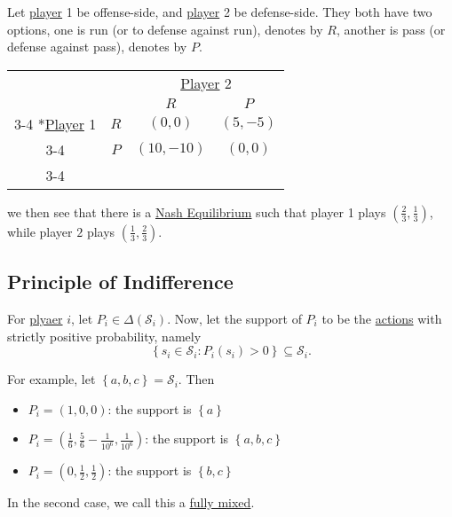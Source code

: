\begin{eg}[Football]\label{eg:football}
	Let \hyperref[def:player]{player} 1 be offense-side, and \hyperref[def:player]{player} 2 be defense-side. They both have two options, one is
	run (or to defense against run), denotes by \(R\), another is pass (or defense against pass), denotes by \(P\).
	\begin{table}[H]
		\centering
		\setlength{\extrarowheight}{2pt}
		\begin{tabular}{cc|c|c|}
			                                               & \multicolumn{1}{c}{} & \multicolumn{2}{c}{\hyperref[def:player]{Player} 2}                           \\
			                                               & \multicolumn{1}{c}{} & \multicolumn{1}{c}{$R$}                             & \multicolumn{1}{c}{$P$} \\\cline{3-4}
			\multirow{2}*{\hyperref[def:player]{Player} 1} & $R$                  & $(0, 0)$                                            & $(5, -5)$               \\\cline{3-4}
			                                               & $P$                  & $(10, -10)$                                         & $(0, 0)$                \\\cline{3-4}
		\end{tabular}
	\end{table}
	we then see that there is a \hyperref[def:Nash-equilibrium]{Nash Equilibrium} such that player 1 plays \((\frac{2}{3}, \frac{1}{3})\), while player \(2\) plays
	\((\frac{1}{3}, \frac{2}{3})\).
\end{eg}

\subsection{Principle of Indifference}
For \hyperref[def:player]{plyaer} \(i\), let \(P_i\in \Delta(\mathcal{S}_{i})\). Now, let the support of \(P_{i}\) to be the \hyperref[def:strategy]{actions} with strictly
positive probability, namely
\[
	\left\{s_{i}\in \mathcal{S}_{i}\colon P_{i}(s_{i})>0\right\}\subseteq \mathcal{S}_{i}.
\]

\begin{eg}
	For example, let \(\left\{a, b, c\right\} = \mathcal{S}_{i}\). Then
	\begin{itemize}
		\item \(P_{i} = (1, 0, 0)\): the support is \(\left\{a\right\}\)
		\item \(P_{i} = (\frac{1}{6}, \frac{5}{6} - \frac{1}{10^6}, \frac{1}{10^6})\): the support is \(\left\{a, b, c\right\}\)
		\item \(P_{i} = (0, \frac{1}{2}, \frac{1}{2})\): the support is \(\left\{b, c\right\}\)
	\end{itemize}
	\begin{note}
		In the second case, we call this a \hyperref[def:fully-mixed]{fully mixed}.
	\end{note}
\end{eg}

